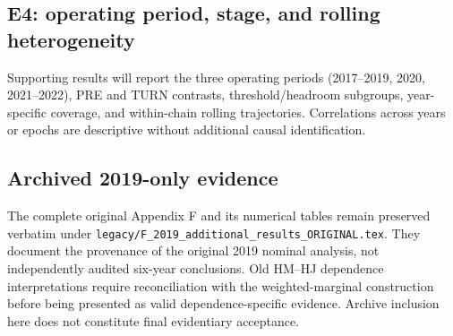 \documentclass[10pt,a4paper]{article}
\numberwithin{equation}{section}
\begin{document}
\subsection{E4: operating period, stage, and rolling heterogeneity}
Supporting results will report the three operating periods (2017--2019, 2020, 2021--2022), PRE and TURN contrasts, threshold/headroom subgroups, year-specific coverage, and within-chain rolling trajectories. Correlations across years or epochs are descriptive without additional causal identification.

\subsection{Archived 2019-only evidence}
The complete original Appendix F and its numerical tables remain preserved verbatim under \texttt{legacy/F\_2019\_additional\_results\_ORIGINAL.tex}. They document the provenance of the original 2019 nominal analysis, not independently audited six-year conclusions. Old HM--HJ dependence interpretations require reconciliation with the weighted-marginal construction before being presented as valid dependence-specific evidence. Archive inclusion here does not constitute final evidentiary acceptance.
\end{document}
